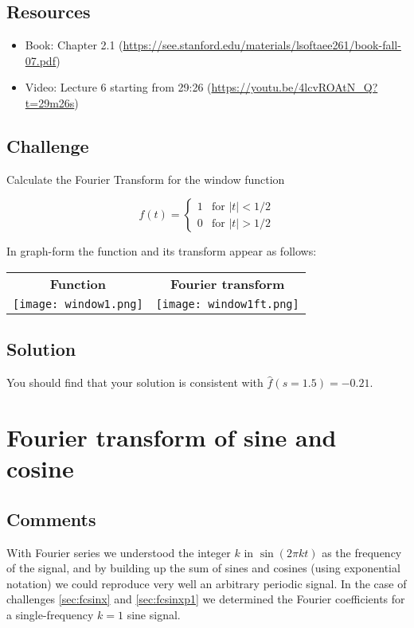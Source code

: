 \subsection*{Resources}
\begin{itemize}
    \item Book: Chapter 2.1 (\url{https://see.stanford.edu/materials/lsoftaee261/book-fall-07.pdf}) %
    \item Video: Lecture 6 starting from 29:26 (\url{https://youtu.be/4lcvROAtN_Q?t=29m26s})
\end{itemize}

\subsection*{Challenge}
Calculate the Fourier Transform for the window function

\begin{equation}
    f(t)=
    \begin{cases}
        1 & \text{for } |t| < 1/2 \\
        0 & \text{for } |t| > 1/2
    \end{cases}
\end{equation}

In graph-form the function and its transform appear as follows:

\begin{tabular}{cc}
    \textbf{Function} & \textbf{Fourier transform} \\
    \texttt{[image: window1.png]} & \texttt{[image: window1ft.png]}
\end{tabular}

\subsection*{Solution}
You should find that your solution is consistent with $\hat{f}(s=1.5)=-0.21$.




\newpage
\section{Fourier transform of sine and cosine}
\label{sec:ftofsinandcos}

\subsection*{Comments}
With Fourier series we understood the integer $k$ in $\sin(2 \pi k t)$ as the frequency of the signal, and by building up the sum of sines and cosines (using exponential notation) we could reproduce very well an arbitrary periodic signal. In the case of challenges \ref{sec:fcsinx} and \ref{sec:fcsinxp1} we determined the Fourier coefficients for a single-frequency $k=1$ sine signal.

